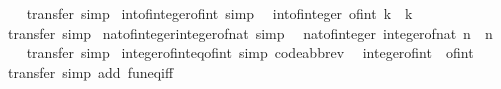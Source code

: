 \begin{isabellebody}
%
\isadelimproof
\ \ %
\endisadelimproof
%
\isatagproof
{}\isamarkupfalse%
\ transfer\ simp%
\endisatagproof
{\isafoldproof}%
%
\isadelimproof
\isanewline
%
\endisadelimproof
\isanewline
{}\isamarkupfalse%
\ int{\isacharunderscore}{\kern0pt}of{\isacharunderscore}{\kern0pt}integer{\isacharunderscore}{\kern0pt}of{\isacharunderscore}{\kern0pt}int\ {\isacharbrackleft}{\kern0pt}simp{\isacharbrackright}{\kern0pt}{\isacharcolon}{\kern0pt}\isanewline
\ \ {\isachardoublequoteopen}int{\isacharunderscore}{\kern0pt}of{\isacharunderscore}{\kern0pt}integer\ {\isacharparenleft}{\kern0pt}of{\isacharunderscore}{\kern0pt}int\ k{\isacharparenright}{\kern0pt}\ {\isacharequal}{\kern0pt}\ k{\isachardoublequoteclose}\isanewline
%
\isadelimproof
\ \ %
\endisadelimproof
%
\isatagproof
{}\isamarkupfalse%
\ transfer\ simp%
\endisatagproof
{\isafoldproof}%
%
\isadelimproof
\isanewline
%
\endisadelimproof
\isanewline
{}\isamarkupfalse%
\ nat{\isacharunderscore}{\kern0pt}of{\isacharunderscore}{\kern0pt}integer{\isacharunderscore}{\kern0pt}integer{\isacharunderscore}{\kern0pt}of{\isacharunderscore}{\kern0pt}nat\ {\isacharbrackleft}{\kern0pt}simp{\isacharbrackright}{\kern0pt}{\isacharcolon}{\kern0pt}\isanewline
\ \ {\isachardoublequoteopen}nat{\isacharunderscore}{\kern0pt}of{\isacharunderscore}{\kern0pt}integer\ {\isacharparenleft}{\kern0pt}integer{\isacharunderscore}{\kern0pt}of{\isacharunderscore}{\kern0pt}nat\ n{\isacharparenright}{\kern0pt}\ {\isacharequal}{\kern0pt}\ n{\isachardoublequoteclose}\isanewline
%
\isadelimproof
\ \ %
\endisadelimproof
%
\isatagproof
{}\isamarkupfalse%
\ transfer\ simp%
\endisatagproof
{\isafoldproof}%
%
\isadelimproof
\isanewline
%
\endisadelimproof
\isanewline
{}\isamarkupfalse%
\ integer{\isacharunderscore}{\kern0pt}of{\isacharunderscore}{\kern0pt}int{\isacharunderscore}{\kern0pt}eq{\isacharunderscore}{\kern0pt}of{\isacharunderscore}{\kern0pt}int\ {\isacharbrackleft}{\kern0pt}simp{\isacharcomma}{\kern0pt}\ code{\isacharunderscore}{\kern0pt}abbrev{\isacharbrackright}{\kern0pt}{\isacharcolon}{\kern0pt}\isanewline
\ \ {\isachardoublequoteopen}integer{\isacharunderscore}{\kern0pt}of{\isacharunderscore}{\kern0pt}int\ {\isacharequal}{\kern0pt}\ of{\isacharunderscore}{\kern0pt}int{\isachardoublequoteclose}\isanewline
%
\isadelimproof
\ \ %
\endisadelimproof
%
\isatagproof
{}\isamarkupfalse%
\ transfer\ {\isacharparenleft}{\kern0pt}simp\ add{\isacharcolon}{\kern0pt}\ fun{\isacharunderscore}{\kern0pt}eq{\isacharunderscore}{\kern0pt}iff{\isacharparenright}{\kern0pt}%

\end{isabellebody}
